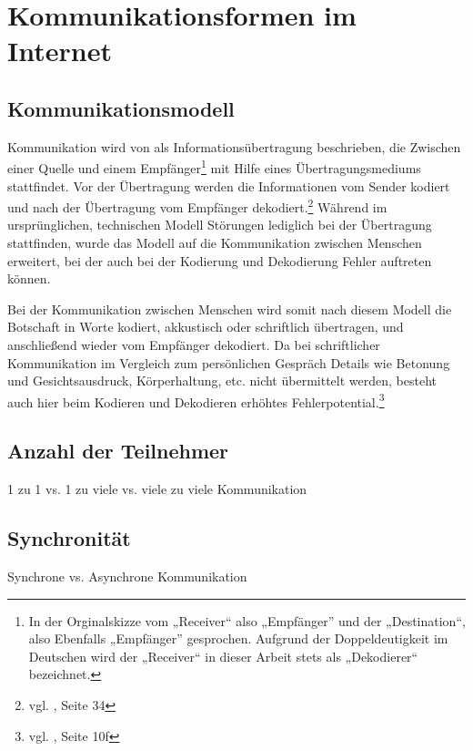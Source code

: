 \label{sec:grundlagen}

\section{Kommunikationsformen im Internet} %
\label{sec:kommunikationsformen_im_internet}

\subsection{Kommunikationsmodell} %
\label{sub:kommunikationsmodell}
Kommunikation wird von \cite{shannonweaver} als Informationsübertragung beschrieben, die Zwischen einer Quelle  und einem Empfänger\footnote{In der Orginalskizze vom „Receiver“ also „Empfänger” und der „Destination“, also Ebenfalls „Empfänger” gesprochen. Aufgrund der Doppeldeutigkeit im Deutschen wird der „Receiver“ in dieser Arbeit stets als „Dekodierer“ bezeichnet.} mit Hilfe eines Übertragungsmediums stattfindet. Vor der Übertragung werden die Informationen vom Sender kodiert und nach der Übertragung vom Empfänger dekodiert.\footnote{vgl. \cite{shannonweaver}, Seite 34} Während im ursprünglichen, technischen Modell Störungen lediglich bei der Übertragung stattfinden, wurde das Modell auf die Kommunikation zwischen Menschen erweitert, bei der auch bei der Kodierung und Dekodierung Fehler auftreten können.

Bei der Kommunikation zwischen Menschen wird somit nach diesem Modell die Botschaft in Worte kodiert, akkustisch oder schriftlich übertragen, und anschließend wieder vom Empfänger dekodiert. Da bei schriftlicher Kommunikation im Vergleich zum persönlichen Gespräch Details wie Betonung und Gesichtsausdruck, Körperhaltung, etc. nicht übermittelt werden, besteht auch hier beim Kodieren und Dekodieren erhöhtes Fehlerpotential.\footnote{vgl. \cite{rothe}, Seite 10f}


\subsection{Anzahl der Teilnehmer} %
\label{sub:anzahl_der_teilnehmer}
1 zu 1 vs. 1 zu viele vs. viele zu viele Kommunikation

\subsection{Synchronität} %
\label{sub:synchronitat}
Synchrone vs. Asynchrone Kommunikation

